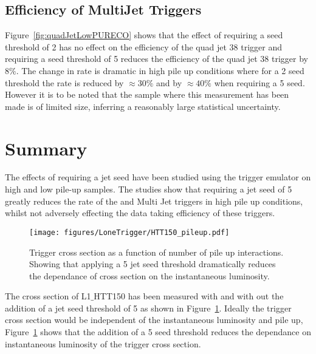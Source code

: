 \subsection{Efficiency of MultiJet Triggers} %
\label{par:Efficiency of MultiJet Triggers}
Figure~\ref{fig:quadJetLowPURECO} shows that the effect of requiring a seed 
threshold of \unit{2}{\GeV} has no effect on the efficiency of the quad jet 
\unit{38}{\GeV} trigger and requiring a seed threshold of \unit{5}{\GeV} 
reduces the efficiency of the quad jet 38 trigger by $8\%$. The change in rate 
is dramatic in high pile up conditions where for a \unit{2}{\GeV} seed 
threshold the rate is reduced by $\approx 30\%$ and by $\approx 40\%$ when 
requiring a \unit{5}{\GeV} seed. However it is to be noted that the sample 
where this measurement has been made is of limited size, inferring a reasonably 
large statistical uncertainty. 



\section{Summary} %
\label{sec:Summary}
The effects of requiring a jet seed have been studied using the \Lone trigger 
emulator on high and low pile-up samples. The studies show that requiring a jet 
seed of \unit{5}{\GeV} greatly reduces the rate of the \HT and Multi Jet triggers in 
high pile up conditions, whilst not adversely effecting the data taking 
efficiency of these triggers.

\begin{figure}[ht]
  \centering
  \texttt{[image: figures/LoneTrigger/HTT150\_pileup.pdf]}
  \caption{Trigger cross section as a function of number of pile up 
  interactions. Showing that applying a \unit{5}{\GeV} jet seed threshold 
  dramatically reduces the dependance of cross section on the instantaneous   
  luminosity.}
  \label{fig:figures_HTT150_pileup}
\end{figure}

The cross section of L1$\_$HTT150 has been measured with and with out the 
addition of a jet seed threshold of \unit{5}{\GeV} as shown in  
Figure~\ref{fig:figures_HTT150_pileup}. Ideally the trigger cross section would 
be independent of the instantaneous luminosity and pile up, 
Figure~\ref{fig:figures_HTT150_pileup} shows that the addition of a 
\unit{5}{\GeV} seed threshold reduces the dependance on instantaneous 
luminosity of the trigger cross section.


